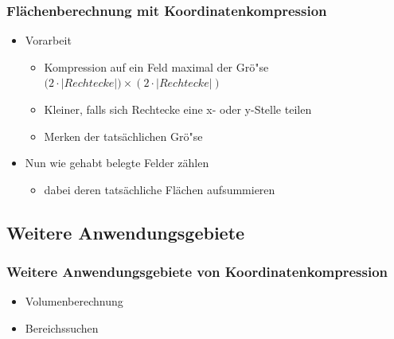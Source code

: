 \begin{frame}
	\frametitle{{Fl\"achenberechnung mit Koordinatenkompression}}
		\pause
	\begin{itemize}
		\item Vorarbeit
		\pause
		\begin{itemize}
			\item Kompression auf ein Feld maximal der Gr\"o"se $\mathcal (2 \cdot \left|Rechtecke\right|)\times(2 \cdot \left|Rechtecke\right|)$
			\pause
			\item Kleiner, falls sich Rechtecke eine x- oder y-Stelle teilen
			\pause
			\item Merken der tats\"achlichen Gr\"o"se
		\end{itemize}
		\pause
		\item Nun wie gehabt belegte Felder z\"ahlen
			\pause
		\begin{itemize}
			\item dabei deren tats\"achliche Fl\"achen aufsummieren
		\end{itemize}
	\end{itemize}
\end{frame}

\subsection{Weitere Anwendungsgebiete}
\begin{frame}
	\frametitle{{Weitere Anwendungsgebiete von Koordinatenkompression}}
	\begin{itemize}
		\item Volumenberechnung
		\pause
		\item Bereichssuchen
	\end{itemize}
\end{frame}